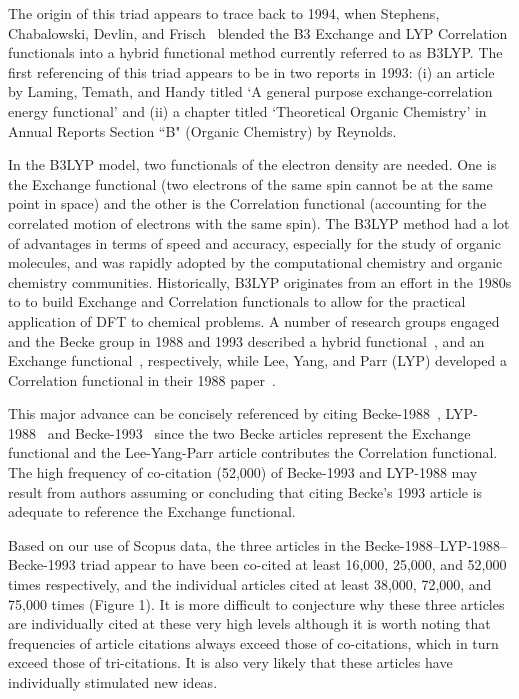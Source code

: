 \documentclass[11pt, oneside]{article}   	%
\begin{document}
The origin of this triad appears to trace back to 1994, when Stephens, Chabalowski, Devlin, and Frisch~\citep{stephens1994ab} blended the B3 Exchange and LYP Correlation functionals into a hybrid functional method currently  referred to as B3LYP.  The first referencing of this triad appears to be in two reports in 1993: (i) an article by Laming, Temath, and Handy\citep{laming1993} titled `A general purpose exchange‐correlation energy functional' and (ii) a chapter titled `Theoretical Organic Chemistry' in Annual Reports Section ``B" (Organic Chemistry) by Reynolds\citep{reynolds1993theoretical}.

In the B3LYP model, two functionals of the electron density are needed. One is the Exchange functional (two electrons of the same spin cannot be at the same point in space) and the other is the Correlation functional (accounting for the correlated motion of electrons with the same spin). The B3LYP method had a lot of advantages in terms of speed and accuracy, especially for the study of organic molecules, and was rapidly adopted by the computational chemistry and organic chemistry communities. Historically, B3LYP originates from an effort in the 1980s to to build Exchange and Correlation functionals to allow for the practical application of DFT to chemical problems. A number of research groups engaged and the Becke group in 1988 and 1993 described a hybrid functional~\citep{becke1988density}, and an Exchange functional~\citep{becke1993dft}, respectively, while Lee, Yang, and Parr (LYP) developed a Correlation functional in their 1988 paper~\citep{lyp1988}.  

This major advance can be concisely referenced by citing Becke-1988~\citep{becke1988density}, LYP-1988~\citep{lyp1988} and Becke-1993~\citep{becke1993dft} since the two Becke articles represent the Exchange functional and the Lee-Yang-Parr article contributes the Correlation functional. The high frequency of co-citation (52,000) of Becke-1993 and LYP-1988 may result from authors assuming or concluding that citing Becke's 1993 article is adequate to reference the Exchange functional. 

Based on our use of Scopus data, the three articles in the Becke-1988--LYP-1988--Becke-1993 triad appear to have been co-cited at least 16,000, 25,000, and 52,000 times respectively, and the individual articles cited at least 38,000, 72,000, and 75,000 times (Figure 1). It is more difficult to conjecture why these three articles are individually cited at these very high levels although it is worth noting that  frequencies of article citations always exceed those of co-citations, which in turn exceed those of tri-citations. It is also very likely that these articles have individually stimulated new ideas.
\end{document}
